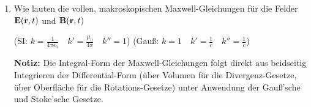 \begin{enumerate}

  \item Wie lauten die vollen, makroskopischen Maxwell-Gleichungen für
        die Felder $\vb E(\vb r, t)$ und $\vb B(\vb r, t)$
        \begin{center}
        (SI: $k=\frac{1}{4\pi\epsilon_0}\quad k'=\frac{\mu_0}{4\pi}\quad
                  k''=1$)
        (Gauß: $k=1\quad k'=\frac{1}{c}\quad
             k''=\frac{1}{c}$) 
        \end{center}
        \begin{center}
        \end{center}
        
        \textbf{Notiz:} Die Integral-Form der Maxwell-Gleichungen folgt
        direkt aus beidseitig Integrieren der Differential-Form (über 
        Volumen für die Divergenz-Gesetze, über Oberfläche für die 
        Rotations-Gesetze) unter Anwendung der Gauß'sche und 
        Stoke'sche Gesetze.


\end{enumerate}

